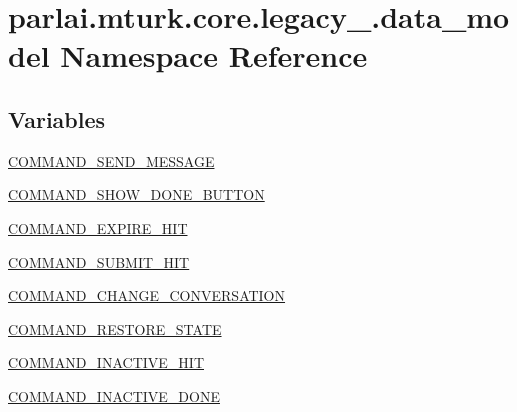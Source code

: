 \hypertarget{namespaceparlai_1_1mturk_1_1core_1_1legacy__2018_1_1data__model}{}\section{parlai.\+mturk.\+core.\+legacy\+\_.\+data\+\_\+model Namespace Reference}
\label{namespaceparlai_1_1mturk_1_1core_1_1legacy__2018_1_1data__model}
\subsection*{Variables}
\begin{DoxyCompactItemize}
\item 
\hyperlink{namespaceparlai_1_1mturk_1_1core_1_1legacy__2018_1_1data__model_a4b591528c911bca153bd5d6c0a03802f}{C\+O\+M\+M\+A\+N\+D\+\_\+\+S\+E\+N\+D\+\_\+\+M\+E\+S\+S\+A\+GE}
\item 
\hyperlink{namespaceparlai_1_1mturk_1_1core_1_1legacy__2018_1_1data__model_acf6ddab7dadadee1a04c541c21757e13}{C\+O\+M\+M\+A\+N\+D\+\_\+\+S\+H\+O\+W\+\_\+\+D\+O\+N\+E\+\_\+\+B\+U\+T\+T\+ON}
\item 
\hyperlink{namespaceparlai_1_1mturk_1_1core_1_1legacy__2018_1_1data__model_aee0bb6690b5fc981d63a34282b559d96}{C\+O\+M\+M\+A\+N\+D\+\_\+\+E\+X\+P\+I\+R\+E\+\_\+\+H\+IT}
\item 
\hyperlink{namespaceparlai_1_1mturk_1_1core_1_1legacy__2018_1_1data__model_a9e13361468962514db987c61f2306644}{C\+O\+M\+M\+A\+N\+D\+\_\+\+S\+U\+B\+M\+I\+T\+\_\+\+H\+IT}
\item 
\hyperlink{namespaceparlai_1_1mturk_1_1core_1_1legacy__2018_1_1data__model_a53d42f08ae725ef6130dc6b70c80fcdb}{C\+O\+M\+M\+A\+N\+D\+\_\+\+C\+H\+A\+N\+G\+E\+\_\+\+C\+O\+N\+V\+E\+R\+S\+A\+T\+I\+ON}
\item 
\hyperlink{namespaceparlai_1_1mturk_1_1core_1_1legacy__2018_1_1data__model_aa36b80edcdacf9cbe4bb3fc085bcdb15}{C\+O\+M\+M\+A\+N\+D\+\_\+\+R\+E\+S\+T\+O\+R\+E\+\_\+\+S\+T\+A\+TE}
\item 
\hyperlink{namespaceparlai_1_1mturk_1_1core_1_1legacy__2018_1_1data__model_a7e68946079a9b31e0ad065011b9efac0}{C\+O\+M\+M\+A\+N\+D\+\_\+\+I\+N\+A\+C\+T\+I\+V\+E\+\_\+\+H\+IT}
\item 
\hyperlink{namespaceparlai_1_1mturk_1_1core_1_1legacy__2018_1_1data__model_a97bc5401d5e28b41fdcfd4ac7b813290}{C\+O\+M\+M\+A\+N\+D\+\_\+\+I\+N\+A\+C\+T\+I\+V\+E\+\_\+\+D\+O\+NE}
\item 

\end{DoxyCompactItemize}
